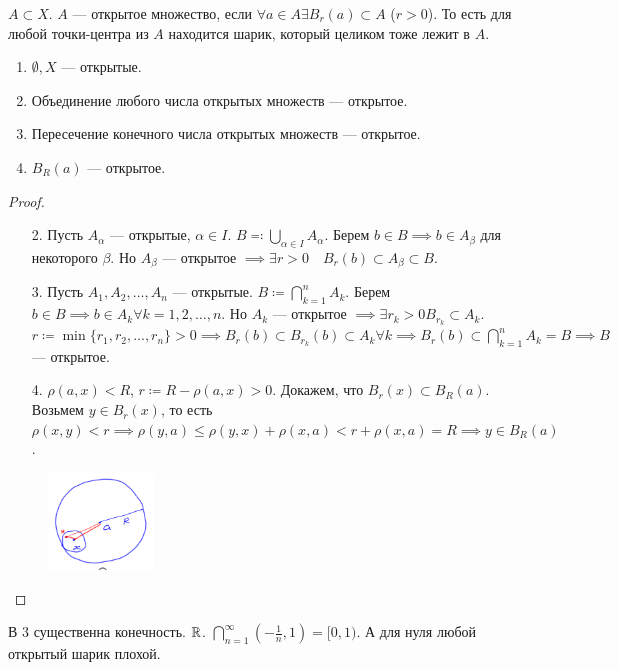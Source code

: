 \begin{definition}
    $A \subset X$.  $A$ --- открытое множество, если  $\forall a \in A \exists B_r(a) \subset A$ ($r > 0$). То есть для любой точки-центра из $A$ находится шарик, который целиком тоже лежит в $A$.
\end{definition}
\begin{theorem}
    \begin{enumerate}
        \item $\emptyset, X$ --- открытые.
        \item Объединение любого числа открытых множеств --- открытое.
        \item Пересечение конечного числа открытых множеств --- открытое.
        \item $B_R(a)$ --- открытое.
    \end{enumerate}
\end{theorem}
\begin{proof}
    \begin{enumerate}
        \item[2.] Пусть $A_{\alpha}$ --- открытые,  $\alpha \in I$.  $B \eqqcolon \bigcup\limits_{\alpha \in I}A_{\alpha}$. Берем  $b \in B \implies b \in A_\beta$ для некоторого  $\beta$. Но  $A_\beta$ --- открытое  $\implies \exists r > 0\quad B_r(b) \subset A_\beta \subset B$.
        \item[3.] Пусть $A_1, A_2, \ldots, A_n$ --- открытые. $B \coloneqq \bigcap\limits_{k=1}^n A_k$. Берем  $b \in B \implies b \in A_k \forall k=1,2,\ldots,n$. Но $A_k$ --- открытое  $\implies \exists r_k > 0 B_{r_k} \subset A_k$. $r \coloneqq \min\{r_1, r_2, ..., r_n\} > 0 \implies B_r(b) \subset B_{r_k}(b) \subset A_k \forall k \implies B_r(b) \subset \bigcap\limits_{k=1}^n A_k = B \implies B$ --- открытое.

         \item[4.] $\rho(a, x) < R$,  $r \coloneqq R - \rho(a, x) > 0$. Докажем, что  $B_r(x) \subset B_R(a)$. Возьмем  $y \in B_r(x)$, то есть  $\rho(x, y) < r \implies \rho(y, a) \le \rho(y, x) + \rho(x, a) < r + \rho(x, a) = R \implies y \in B_R(a)$.
    \end{enumerate}
             \begin{figure}[h!]
                \includegraphics[width=0.25\textwidth]{open_set}
             \end{figure}
\end{proof}
\begin{remark}
    В 3 существенна конечность. $\mathbb{R}$.  $\bigcap\limits_{n=1}^{\infty}(-\frac{1}{n}, 1) = [0, 1)$. А для нуля любой открытый шарик плохой.
\end{remark}
